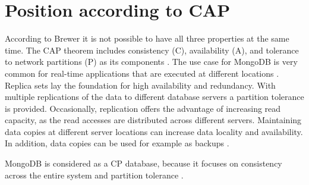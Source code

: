 
\section{Position according to CAP}

According to Brewer it is not possible to have all three properties at the same time. 
The CAP theorem includes consistency (C), availability (A), and tolerance to network partitions (P) as its components \parencite{Brewer2000}.
The use case for MongoDB is very common for real-time applications that are executed at different locations \parencite{Jayasekara2021}.
\\
Replica sets lay the foundation for high availability and redundancy. With multiple replications of the data to different database servers a partition tolerance is provided.
Occasionally, replication offers the advantage of increasing read capacity, as the read accesses are distributed across different servers.
Maintaining data copies at different server locations can increase data locality and availability. In addition, data copies can be used for example as backups \parencite{Mongo-Replication}.










MongoDB is considered as a CP database, because it focuses on consistency across the entire system and partition tolerance \parencite{Jayasekara2021}.




